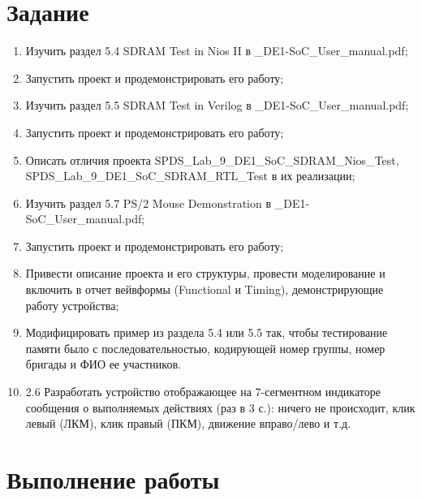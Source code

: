 \documentclass[a4paper,14pt]{article}
\begin{document}
	
	\tableofcontents
	\pagebreak
	\section{Задание}
	
	\begin{enumerate}
		
		\item Изучить раздел 5.4 SDRAM Test in Nios II в \_DE1-SoC\_User\_manual.pdf;
		
		\item Запустить проект и продемонстрировать его работу;
		
		\item Изучить раздел 5.5 SDRAM Test in Verilog в \_DE1-SoC\_User\_manual.pdf;
		
		\item Запустить проект и продемонстрировать его работу;
		
		\item Описать отличия проекта SPDS\_Lab\_9\_DE1\_SoC\_SDRAM\_Nios\_Test, SPDS\_Lab\_9\_DE1\_SoC\_SDRAM\_RTL\_Test в их реализации;
		
		\item Изучить раздел 5.7 PS/2 Mouse Demonstration в \_DE1-SoC\_User\_manual.pdf;
		
		\item Запустить проект и продемонстрировать его работу;
		
		\item Привести описание проекта и его структуры, провести моделирование и включить в отчет вейвформы (Functional и Timing), демонстрирующие работу устройства;
		
		\item Модифицировать пример из раздела 5.4 или 5.5 так, чтобы тестирование памяти было с последовательностью, кодирующей номер группы, номер бригады и ФИО ее участников.
		
		\item 2.6 Разработать устройство отображающее на 7-сегментном индикаторе сообщения о выполняемых действиях (раз в 3 с.): ничего не происходит, клик левый (ЛКМ), клик правый (ПКМ), движение вправо/лево и т.д.  
		
	\end{enumerate}
	\pagebreak
	
	\section{Выполнение работы}
	
\end{document}
